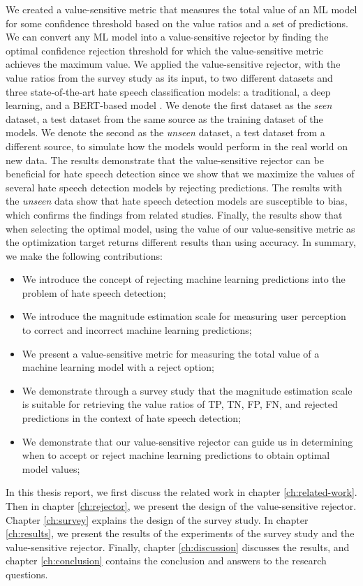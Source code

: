 %
We created a value-sensitive metric that measures the total value of an ML model for some confidence threshold based on the value ratios and a set of predictions.
%
We can convert any ML model into a value-sensitive rejector by finding the optimal confidence rejection threshold for which the value-sensitive metric achieves the maximum value.
%
We applied the value-sensitive rejector, with the value ratios from the survey study as its input, to two different datasets and three state-of-the-art hate speech classification models: a traditional, a deep learning, and a BERT-based model \citep{devlin2018bert}.
%
We denote the first dataset as the \emph{seen} dataset, a test dataset from the same source as the training dataset of the models.
%
We denote the second as the \emph{unseen} dataset, a test dataset from a different source, to simulate how the models would perform in the real world on new data.
%
The results demonstrate that the value-sensitive rejector can be beneficial for hate speech detection since we show that we maximize the values of several hate speech detection models by rejecting predictions.
%
The results with the \emph{unseen} data show that hate speech detection models are susceptible to bias, which confirms the findings from related studies.
%
Finally, the results show that when selecting the optimal model, using the value of our value-sensitive metric as the optimization target returns different results than using accuracy.
%
In summary, we make the following contributions:
%
\begin{itemize}
	\item We introduce the concept of rejecting machine learning predictions into the problem of hate speech detection;
	\item We introduce the magnitude estimation scale for measuring user perception to correct and incorrect machine learning predictions;
	\item We present a value-sensitive metric for measuring the total value of a machine learning model with a reject option;
	\item We demonstrate through a survey study that the magnitude estimation scale is suitable for retrieving the value ratios of TP, TN, FP, FN, and rejected predictions in the context of hate speech detection;
	\item We demonstrate that our value-sensitive rejector can guide us in determining when to accept or reject machine learning predictions to obtain optimal model values;
\end{itemize}

%
In this thesis report, we first discuss the related work in chapter \ref{ch:related-work}.
%
Then in chapter \ref{ch:rejector}, we present the design of the value-sensitive rejector.
%
Chapter \ref{ch:survey} explains the design of the survey study.
%
In chapter \ref{ch:results}, we present the results of the experiments of the survey study and the value-sensitive rejector.
%
Finally, chapter \ref{ch:discussion} discusses the results, and chapter \ref{ch:conclusion} contains the conclusion and answers to the research questions.

